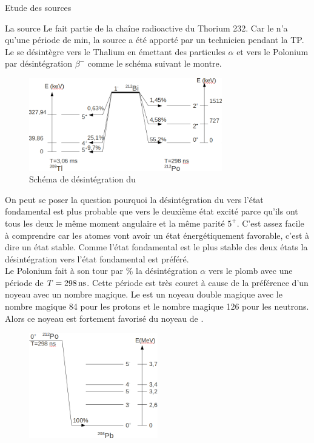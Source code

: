 \documentclass[a4paper,11pt,liststotocnumbered,bibtotocnumbered]{scrartcl}
\begin{document}
\begin{section}{Etude des sources}
  \begin{subsection}{La source }
   Le  fait partie de la chaîne radioactive du Thorium 232. Car le   n'a qu'une période de \unit[60,5]{min}, la source a été apporté par un technicien pendant la TP. Le  se désintègre vers le Thalium  en émettant des particules $\alpha$  et vers le Polonium par désintégration $\beta^-$ comme le schéma suivant le montre.\\
   \begin{figure}[H]
    \begin{center}
     \includegraphics[width=0.75\textwidth]{Bilder/schemaBi1.png}
    \end{center}
    \caption{Schéma de désintégration du  }
   \end{figure}
   On peut se poser la question pourquoi la désintégration du  vers l'état fondamental est plus probable que vers le deuxième état excité parce qu'ils ont tous les deux le même moment angulaire et la même parité $5^+$. C'est assez facile à comprendre car les atomes vont avoir un état énergétiquement favorable, c'est à dire un état stable. Comme l'état fondamental est le plus stable des deux états la désintégration vers l'état fondamental est préféré.\\
\newpage
   Le Polonium  fait à son tour par \unit[100]{\%} la désintégration $\alpha$ vers le plomb  avec une période de $T=\unit[298]{ns}$. Cette période est très couret à cause de la préférence d'un noyeau avec un nombre magique. Le  est un noyeau double magique avec le nombre magique 84 pour les protons et le nombre magique 126 pour les neutrons. Alors ce noyeau est fortement favorisé du noyeau de .
   \begin{figure}[H]
    \begin{center}
     \includegraphics[width=0.5\textwidth]{Bilder/schemaPo1.png}

\end{center}
\end{figure}
\end{subsection}
\end{section}
\end{document}
